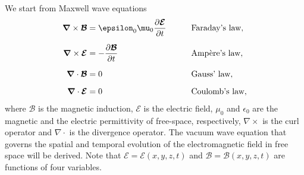 \documentclass{iucr}              %
\begin{document}
We start from Maxwell wave equations
\begin{equation}
\label{eq: Maxwell equations}
\begin{aligned}
\bm{\nabla} \times \bm{\mathcal{B}} &=\epsilon_0 \mu_0 \frac{\partial \bm{\mathcal{E}}}{\partial t}
&\qquad &\text{Faraday's law},\\[2\jot]
\bm{\nabla} \times \bm{\mathcal{E}} &= -\frac{\partial \bm{\mathcal{B}}}{\partial t}
&\qquad &\text{Amp\`{e}re's law},\\[2\jot]
\bm{\nabla} \cdot \bm{\mathcal{B}}    &= 0 & \qquad &\text{Gauss' law},\\[2\jot]
\bm{\nabla} \cdot \bm{\mathcal{E}}    &= 0 & \qquad &\text{Coulomb's law},
\end{aligned}
\end{equation}
where $\mathcal{B}$ is the magnetic induction, $\mathcal{E}$ is the electric field, $\mu_0$ and $\epsilon_0$ are the magnetic and the electric permittivity of free-space, respectively, $\nabla \times$ is the curl operator and $\nabla \cdot$ is the divergence operator. The vacuum wave equation that governs the spatial and temporal evolution of the electromagnetic field in free space will be derived. Note that $\mathcal{E}=\mathcal{E}(x,y,z,t)$ and $\mathcal{B}=\mathcal{B}(x,y,z,t)$ are functions of four variables. 
\end{document}
